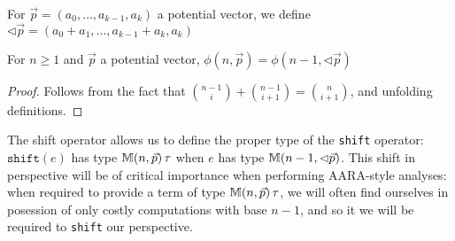 \begin{definition}
For $\vec{p} = (a_0,\dots,a_{k-1},a_k)$ a potential vector, we define $\lhd \vec{p} = (a_0 + a_1,\dots,a_{k-1} + a_k,a_k)$
\end{definition}

\begin{theorem}
\label{thm:raml-shift}
For $n \geq 1$ and $\vec{p}$ a potential vector, $\phi(n,\vec{p}) = \phi(n-1,\lhd \vec{p})$
\label{thm:shift}
\end{theorem}
\begin{proof}
Follows from the fact that $\binom{n-1}{i} + \binom{n-1}{i+1} = \binom{n}{i+1}$, and unfolding definitions.
\iffalse
\begin{align*}
  \phi(n-1,\lhd \vec{p}) &= \sum_{i=0}^k p_i\binom{n-1}{i} + \sum_{i=0}^{k-1} p_{i+1}\binom{n-1}{i}\\
                         &= p_0 + \sum_{i=1}^k p_i\binom{n-1}{i} + \sum_{i=0}^{k-1} p_{i+1}\binom{n-1}{i}\\
                         &= p_0 + \sum_{i=0}^{k-1} p_{i+1}\left(\binom{n-1}{i+1} + \binom{n-1}{i}\right)\\
                         &= p_0 + \sum_{i=0}^{k-1} p_{i+1}\binom{n}{i+1}\\
                         &= \sum_{i=0}^k p_i \binom{n}{i}\\
                         &= \phi(n,\vec{p})
\end{align*}
\fi
\end{proof}

The shift operator allows us to define the proper type of the \texttt{shift} operator: $\texttt{shift}(e)$ has type $\mathbb{M} (n,\vec{p}) \, \tau$ when $e$ has type $\mathbb{M} (n-1,\lhd\vec{p})$. This shift in perspective will be of critical importance when performing AARA-style analyses: when required to provide a term of type $\mathbb{M} (n,\vec{p}) \, \tau$, we will often find ourselves in posession of only costly computations with base $n-1$, and so it we will be required to \texttt{shift} our perspective.

